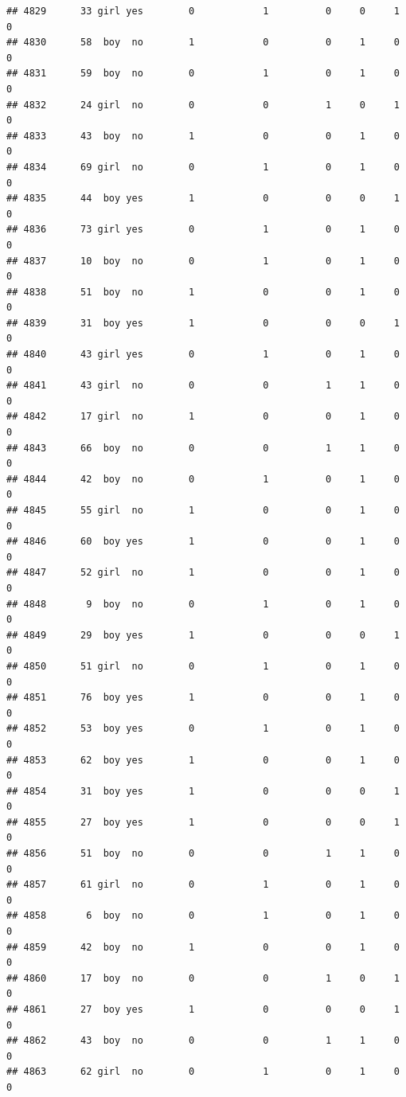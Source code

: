 \documentclass[man]{apa6}
\begin{document}
\begin{verbatim}
## 4829      33 girl yes        0            1          0     0     1     0
## 4830      58  boy  no        1            0          0     1     0     0
## 4831      59  boy  no        0            1          0     1     0     0
## 4832      24 girl  no        0            0          1     0     1     0
## 4833      43  boy  no        1            0          0     1     0     0
## 4834      69 girl  no        0            1          0     1     0     0
## 4835      44  boy yes        1            0          0     0     1     0
## 4836      73 girl yes        0            1          0     1     0     0
## 4837      10  boy  no        0            1          0     1     0     0
## 4838      51  boy  no        1            0          0     1     0     0
## 4839      31  boy yes        1            0          0     0     1     0
## 4840      43 girl yes        0            1          0     1     0     0
## 4841      43 girl  no        0            0          1     1     0     0
## 4842      17 girl  no        1            0          0     1     0     0
## 4843      66  boy  no        0            0          1     1     0     0
## 4844      42  boy  no        0            1          0     1     0     0
## 4845      55 girl  no        1            0          0     1     0     0
## 4846      60  boy yes        1            0          0     1     0     0
## 4847      52 girl  no        1            0          0     1     0     0
## 4848       9  boy  no        0            1          0     1     0     0
## 4849      29  boy yes        1            0          0     0     1     0
## 4850      51 girl  no        0            1          0     1     0     0
## 4851      76  boy yes        1            0          0     1     0     0
## 4852      53  boy yes        0            1          0     1     0     0
## 4853      62  boy yes        1            0          0     1     0     0
## 4854      31  boy yes        1            0          0     0     1     0
## 4855      27  boy yes        1            0          0     0     1     0
## 4856      51  boy  no        0            0          1     1     0     0
## 4857      61 girl  no        0            1          0     1     0     0
## 4858       6  boy  no        0            1          0     1     0     0
## 4859      42  boy  no        1            0          0     1     0     0
## 4860      17  boy  no        0            0          1     0     1     0
## 4861      27  boy yes        1            0          0     0     1     0
## 4862      43  boy  no        0            0          1     1     0     0
## 4863      62 girl  no        0            1          0     1     0     0

\end{verbatim}
\end{document}
